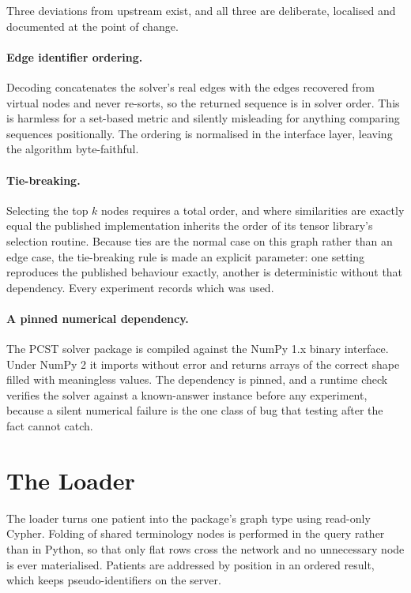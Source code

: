 Three deviations from upstream exist, and all three are deliberate, localised and
documented at the point of change.

\paragraph{Edge identifier ordering.} Decoding concatenates the solver's real
edges with the edges recovered from virtual nodes and never re-sorts, so the
returned sequence is in solver order. This is harmless for a set-based metric and
silently misleading for anything comparing sequences positionally. The ordering is
normalised in the interface layer, leaving the algorithm byte-faithful.

\paragraph{Tie-breaking.} Selecting the top $k$ nodes requires a total order, and
where similarities are exactly equal the published implementation inherits the
order of its tensor library's selection routine. Because ties are the normal case
on this graph rather than an edge case, the tie-breaking rule is made an explicit
parameter: one setting reproduces the published behaviour exactly, another is
deterministic without that dependency. Every experiment records which was used.

\paragraph{A pinned numerical dependency.} The PCST solver package is compiled
against the NumPy 1.x binary interface. Under NumPy 2 it imports without error and
returns arrays of the correct shape filled with meaningless values. The dependency
is pinned, and a runtime check verifies the solver against a known-answer instance
before any experiment, because a silent numerical failure is the one class of bug
that testing after the fact cannot catch.

\section{The Loader} \label{sec:implementation-loader}

The loader turns one patient into the package's graph type using read-only
Cypher. Folding of shared terminology nodes is performed in the query rather than
in Python, so that only flat rows cross the network and no unnecessary node is
ever materialised. Patients are addressed by position in an ordered result, which
keeps pseudo-identifiers on the server.

